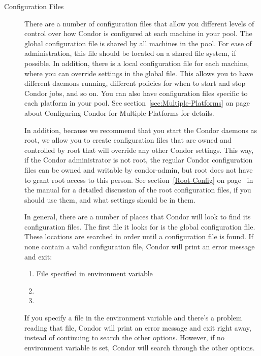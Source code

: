 \begin{description}
\item[Configuration Files] There are a number of configuration files
that allow you
different levels of control over how Condor is configured at each
machine in your pool.  
The global configuration file is shared by all machines in the pool.
For ease of administration, this file should be located on a shared
file system, if possible.
In addition, there is a local
configuration file for each machine, where you can override settings in the
global file.  This allows you to have different daemons running,
different policies for when to start and stop Condor jobs, and so on.
You can also have configuration files specific to each platform in your pool.
See
section~\ref{sec:Multiple-Platforms} on
page~\pageref{sec:Multiple-Platforms} about Configuring Condor for
Multiple Platforms for details.

In addition, because we recommend that you start the Condor daemons as
root, we allow you to create configuration files that are owned and
controlled by root that will override any other Condor settings.  This
way, if the Condor administrator is not root, the regular Condor configuration
files can be owned and writable by condor-admin, but root does not have
to grant root access to this person.  See
section~\ref{Root-Config} on page~\pageref{Root-Config} in the
manual for a detailed discussion of the root configuration files, if you
should use them, and what settings should be in them.

In general, there are a number of places that Condor will look to find
its configuration files.  The first file it looks for is the global configuration
file.  These locations are searched in order until a configuration file is
found.  If none contain a valid configuration file, Condor will print an
error message and exit:
\begin{enumerate}
   \item File specified in  environment variable
   \item {}
   \item {}
\end{enumerate}

If you specify a file in the  environment variable
and there's a problem reading that file, Condor will print an error
message and exit right away, instead of continuing to search the other
options.
However, if no  environment variable is set,
Condor will search through the other options.


\end{description}
